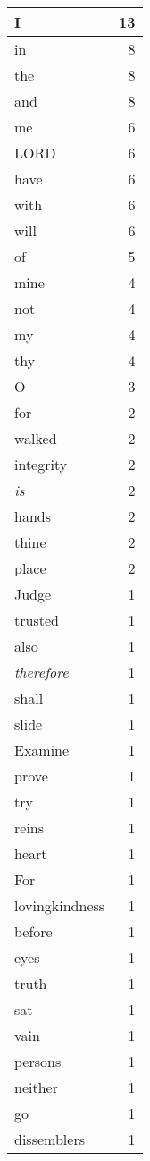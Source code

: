 \begin{center}
\begin{longtable}{l|r}
\hline \hline
\endlastfoot
I & 13 \\ \hline
in & 8 \\ \hline
the & 8 \\ \hline
and & 8 \\ \hline
me & 6 \\ \hline
LORD & 6 \\ \hline
have & 6 \\ \hline
with & 6 \\ \hline
will & 6 \\ \hline
of & 5 \\ \hline
mine & 4 \\ \hline
not & 4 \\ \hline
my & 4 \\ \hline
thy & 4 \\ \hline
O & 3 \\ \hline
for & 2 \\ \hline
walked & 2 \\ \hline
integrity & 2 \\ \hline
\emph{is} & 2 \\ \hline
hands & 2 \\ \hline
thine & 2 \\ \hline
place & 2 \\ \hline
Judge & 1 \\ \hline
trusted & 1 \\ \hline
also & 1 \\ \hline
\emph{therefore} & 1 \\ \hline
shall & 1 \\ \hline
slide & 1 \\ \hline
Examine & 1 \\ \hline
prove & 1 \\ \hline
try & 1 \\ \hline
reins & 1 \\ \hline
heart & 1 \\ \hline
For & 1 \\ \hline
lovingkindness & 1 \\ \hline
before & 1 \\ \hline
eyes & 1 \\ \hline
truth & 1 \\ \hline
sat & 1 \\ \hline
vain & 1 \\ \hline
persons & 1 \\ \hline
neither & 1 \\ \hline
go & 1 \\ \hline
dissemblers & 1 \\ \hline

\end{longtable}
\end{center}

